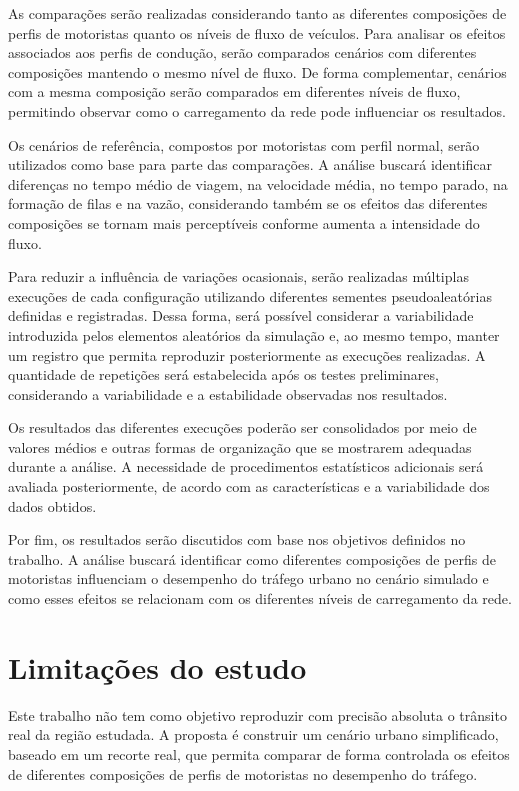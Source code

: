 As comparações serão realizadas considerando tanto as diferentes composições de perfis de motoristas quanto os níveis de fluxo de veículos. Para analisar os efeitos associados aos perfis de condução, serão comparados cenários com diferentes composições mantendo o mesmo nível de fluxo. De forma complementar, cenários com a mesma composição serão comparados em diferentes níveis de fluxo, permitindo observar como o carregamento da rede pode influenciar os resultados.

Os cenários de referência, compostos por motoristas com perfil normal, serão utilizados como base para parte das comparações. A análise buscará identificar diferenças no tempo médio de viagem, na velocidade média, no tempo parado, na formação de filas e na vazão, considerando também se os efeitos das diferentes composições se tornam mais perceptíveis conforme aumenta a intensidade do fluxo.

Para reduzir a influência de variações ocasionais, serão realizadas múltiplas execuções de cada configuração utilizando diferentes sementes pseudoaleatórias definidas e registradas. Dessa forma, será possível considerar a variabilidade introduzida pelos elementos aleatórios da simulação e, ao mesmo tempo, manter um registro que permita reproduzir posteriormente as execuções realizadas. A quantidade de repetições será estabelecida após os testes preliminares, considerando a variabilidade e a estabilidade observadas nos resultados.

Os resultados das diferentes execuções poderão ser consolidados por meio de valores médios e outras formas de organização que se mostrarem adequadas durante a análise. A necessidade de procedimentos estatísticos adicionais será avaliada posteriormente, de acordo com as características e a variabilidade dos dados obtidos.

Por fim, os resultados serão discutidos com base nos objetivos definidos no trabalho. A análise buscará identificar como diferentes composições de perfis de motoristas influenciam o desempenho do tráfego urbano no cenário simulado e como esses efeitos se relacionam com os diferentes níveis de carregamento da rede.

\section{Limitações do estudo}

Este trabalho não tem como objetivo reproduzir com precisão absoluta o trânsito real da região estudada. A proposta é construir um cenário urbano simplificado, baseado em um recorte real, que permita comparar de forma controlada os efeitos de diferentes composições de perfis de motoristas no desempenho do tráfego.

